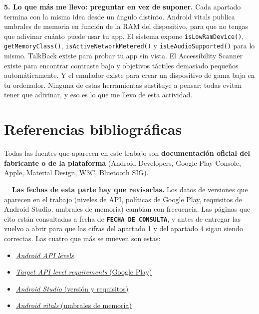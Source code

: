 \documentclass[11pt,a4paper]{article}
\newcommand{\code}[1]{\texttt{\color{navylight}#1}}
\begin{document}
	\textbf{5. Lo que más me llevo: preguntar en vez de suponer.} Cada apartado termina con la misma idea desde un ángulo distinto. Android vitals publica umbrales de memoria en función de la RAM del dispositivo, para que no tengas que adivinar cuánto puede usar tu app. El sistema expone \code{isLowRamDevice()}, \code{getMemoryClass()}, \code{isActiveNetworkMetered()} y \code{isLeAudioSupported()} para lo mismo. TalkBack existe para probar tu app sin vista. El Accessibility Scanner existe para encontrar contraste bajo y objetivos táctiles demasiado pequeños automáticamente. Y el emulador existe para crear un dispositivo de gama baja en tu ordenador. Ninguna de estas herramientas sustituye a pensar; todas evitan tener que adivinar, y eso es lo que me llevo de esta actividad.
	
	\newpage
	\section*{Referencias bibliográficas}
	
	Todas las fuentes que aparecen en este trabajo son \textbf{documentación oficial del fabricante o de la plataforma} (Android Developers, Google Play Console, Apple, Material Design, W3C, Bluetooth SIG).
	
	\begin{warnbox}
		\textbf{\color{accent!80!black}\faExclamationTriangle\ \ Las fechas de esta parte hay que revisarlas.}
		Los datos de versiones que aparecen en el trabajo (niveles de API, políticas de Google Play,
		requisitos de Android Studio, umbrales de memoria) cambian con frecuencia. Las páginas que cito
		están consultadas a fecha de \textbf{\texttt{FECHA DE CONSULTA}}, y antes de entregar las vuelvo
		a abrir para que las cifras del apartado 1 y del apartado 4 sigan siendo correctas. Las cuatro que
		más se mueven son estas:
		\begin{itemize}[leftmargin=*,itemsep=0.15em,topsep=0.2em]
			\item \href{https://developer.android.com/tools/releases/platforms}{\emph{Android API levels}}
			\item \href{https://support.google.com/googleplay/android-developer/answer/11926878}{\emph{Target API level requirements} (Google Play)}
			\item \href{https://developer.android.com/studio}{\emph{Android Studio} (versión y requisitos)}
			\item \href{https://developer.android.com/topic/performance/vitals}{\emph{Android vitals} (umbrales de memoria)}
		\end{itemize}
	\end{warnbox}
	
\end{document}
